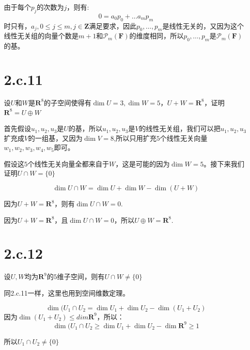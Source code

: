 \documentclass[10pt,a4paper,UTF8]{article}
\begin{document}
\begin{answer}
由于每个\(p_{j}\)的次数为\(j\)，则有:
\begin{equation}
\label{eq:6}
0 = a_{0}p_{0} + \ldots a_{m}p_{m}
\end{equation}
时只有，\(a_{j},0\leq j \leq m,j\in \mathbf{Z}\)满足要求，因此\(p_{0},\ldots ,p_{m}\)是线性无关的，又因为这个线性无关组的向量个数是\(m+1\)和\(\mathcal{P}_{m}(\mathbf{F})\)的维度相同，所以\(p_{0},\ldots ,p_{m}\)是\(\mathcal{P}_{m}(\mathbf{F})\)的基。
\end{answer}
\section{2.c.11}
\label{sec:org9aee178}


\begin{problem}
设\(U\)和\(W\)是\(\mathbf{R}^{8}\)的子空间使得有\(\dim U = 3,\dim W = 5\)，\(U+W = \mathbf{R}^{8}\)，证明\(\mathbf{R}^{8} = U\oplus W\)
\end{problem}

\begin{answer}
首先假设\(u_{1},u_{2},u_{3}\)是\(U\)的基，所以\(u_{1},u_{2},u_{3}\)是\(V\)的线性无关组，我们可以把\(u_{1},u_{2},u_{3}\)扩充成\(V\)的一组基，又因为\(\dim V  =8\),所以只用扩充\(5\)个线性无关向量\(w_{1},w_{2},w_{3},w_{4},w_{5}\)即可。

假设这\(5\)个线性无关向量全都来自于\(W\)，这是可能的因为\(\dim W = 5\)。接下来我们证明\(U\cap W = \{0\}\)

\begin{equation}
\label{eq:8}
\dim U\cap W = \dim U + \dim W - \dim (U+W)
\end{equation}

因为\(U+W = \mathbf{R}^{8}\)，则有\(\dim U\cap W = 0\).

因为\(U+W=\mathbf{R}^{8}\)，且\(\dim U\cap W = 0\)，所以\(U\oplus W=\mathbf{R}^{8}\).
\end{answer}
\section{2.c.12}
\label{sec:orgee1c804}


\begin{problem}
设\(U,W\)均为\(\mathbf{R}^{9}\)的\(5\)维子空间，则有\(U\cap W \neq \{0\}\)
\end{problem}

\begin{answer}
同2.c.11一样，这里也用到空间维数定理。

\begin{equation}
\label{eq:9}
\dim(U_{1}\cap U_{2} = \dim U_{1} + \dim U_{2} - \dim (U_{1}+U_{2})
\end{equation}
因为\(\dim (U_{1} + U_{2}) \leq dim \mathbf{R}^{9}\)，所以：
\begin{equation}
\label{eq:10}
\dim(U_{1}\cap U_{2} \geq \dim U_{1} + \dim U_{2} - \dim \mathbf{R}^{9} \geq 1
\end{equation}

所以\(U_{1}\cap U_{2} \neq \{0\}\)
\end{answer}
\end{document}
